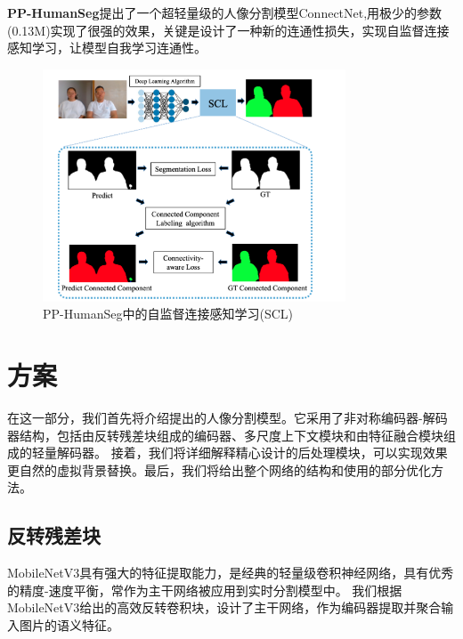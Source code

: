 \documentclass[11pt]{article}
\begin{document}
\textbf{PP-HumanSeg}\cite{ref42}提出了一个超轻量级的人像分割模型ConnectNet,用极少的参数(0.13M)实现了很强的效果，关键是设计了一种新的连通性损失，实现自监督连接感知学习，让模型自我学习连通性。
\begin{figure}[H]
    \centering
    \includegraphics[width=9cm]{pph.png}
\centering
\caption{PP-HumanSeg\cite{ref42}中的自监督连接感知学习(SCL)}
\end{figure}
\section{方案}
在这一部分，我们首先将介绍提出的人像分割模型。它采用了非对称编码器-解码器结构，包括由反转残差块组成的编码器、多尺度上下文模块和由特征融合模块组成的轻量解码器。
接着，我们将详细解释精心设计的后处理模块，可以实现效果更自然的虚拟背景替换。最后，我们将给出整个网络的结构和使用的部分优化方法。
\subsection{反转残差块}
MobileNetV3\cite{ref12}具有强大的特征提取能力，是经典的轻量级卷积神经网络，具有优秀的精度-速度平衡，常作为主干网络被应用到实时分割模型中。
我们根据MobileNetV3给出的高效反转卷积块，设计了主干网络，作为编码器提取并聚合输入图片的语义特征。
\end{document}
